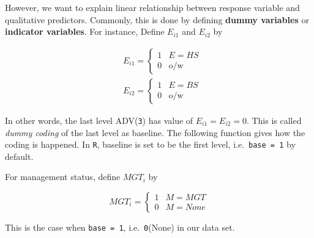 \documentclass[]{book}
\newenvironment{Shaded}{\begin{snugshade}}{\end{snugshade}}
\newcommand{\CommentTok}[1]{\textcolor[rgb]{0.56,0.35,0.01}{\textit{#1}}}
\newcommand{\DataTypeTok}[1]{\textcolor[rgb]{0.13,0.29,0.53}{#1}}
\newcommand{\DecValTok}[1]{\textcolor[rgb]{0.00,0.00,0.81}{#1}}
\newcommand{\KeywordTok}[1]{\textcolor[rgb]{0.13,0.29,0.53}{\textbf{#1}}}
\newcommand{\NormalTok}[1]{#1}
\newcommand{\OperatorTok}[1]{\textcolor[rgb]{0.81,0.36,0.00}{\textbf{#1}}}
\theoremstyle{definition}
\theoremstyle{definition}
\theoremstyle{definition}
\theoremstyle{remark}
\begin{document}
However, we want to explain linear relationship between response variable and qualitative predictors. Commonly, this is done by defining \textbf{dummy variables} or \textbf{indicator variables}. For instance, Define \(E_{i1}\) and \(E_{i2}\) by

\begin{equation*}
  \begin{split}
    & E_{i1} = \begin{cases}
      1 & E = HS \\
      0 & \text{o/w}
    \end{cases} \\
    & E_{i2} = \begin{cases}
      1 & E = BS \\
      0 & \text{o/w}
    \end{cases}
  \end{split}
\end{equation*}

In other words, the last level ADV(\texttt{3}) has value of \(E_{i1} = E_{i2} = 0\). This is called \emph{dummy coding} of the last level as baseline. The following function gives how the coding is happened. In \texttt{R}, baseline is set to be the first level, i.e.~\texttt{base\ =\ 1} by default.

\begin{Shaded}
\end{Shaded}

For management status, define \(MGT_i\) by

\[
MGT_i = \begin{cases}
  1 & M = MGT \\
  0 & M = None
\end{cases}
\]

This is the case when \texttt{base\ =\ 1}, i.e.~\texttt{0}(None) in our data set.

\begin{Shaded}
\end{Shaded}
\end{document}

